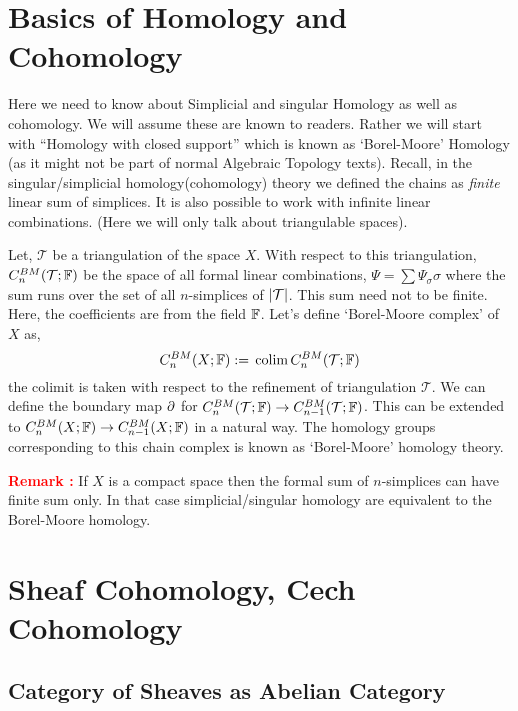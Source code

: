 \documentclass[11pt]{article}
\author{\textsc{Trishan Mondal} \\[0.15cm]
  \href{https://www.isibang.ac.in}{Indian Statistical Institute, Bangalore}}
\date{}
\begin{document}
    \maketitle
    \section{Basics of Homology and Cohomology}
        Here we need to know about Simplicial and singular Homology as well as cohomology. We will assume these are known to readers. Rather we will start with ``Homology with closed support'' which is known as `Borel-Moore' Homology (as it might not be part of normal Algebraic Topology texts). Recall, in the singular/simplicial homology(cohomology) theory we defined the chains as \textit{finite} linear sum of simplices. It is also possible to work with infinite linear combinations. (Here we will only talk about triangulable spaces). 

        \vspace*{0.2cm}

       \noindent Let, $\mathcal{T}$ be a triangulation of the space $X$. With respect to this triangulation, $C^{BM}_n(\mathcal{T};\mathbb{F})$ be the space of all formal linear combinations, $\Psi = \sum \Psi_{\sigma}\sigma$ where the sum runs over the set of all $n$-simplices of $\abs{\mathcal{T}}$. This sum need not to be finite. Here, the coefficients are from the field $\mathbb{F}$. Let's define `Borel-Moore complex' of $X$ as, $$C^{BM}_n(X;\mathbb{F}) :=\, \operatorname{colim} C^{BM}_n(\mathcal{T};\mathbb{F})$$
       the colimit is taken with respect to the refinement of triangulation $\mathcal{T}$. We can define the boundary map $\partial$ for $C^{BM}_n(\mathcal{T};\mathbb{F}) \to C^{BM}_{n-1}(\mathcal{T};\mathbb{F})$. This can be extended to $C^{BM}_n(X;\mathbb{F}) \to C^{BM}_{n-1}(X;\mathbb{F})$ in a natural way. The homology groups corresponding to this chain complex is known as `Borel-Moore' homology theory. 

       \vspace*{0.2cm}

      \noindent \textcolor{red}{\textbf{Remark :}} If $X$ is a compact space then the formal sum of $n$-simplices can have finite sum only. In that case simplicial/singular homology are equivalent to the Borel-Moore homology. 

    \section{Sheaf Cohomology, Cech Cohomology}

    \subsection{Category of Sheaves as Abelian Category}
\end{document}

